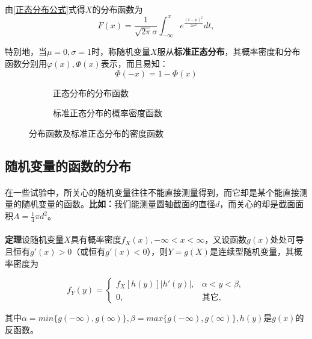 \paragraph{}
由\eqref{正态分布公式}式得$X$的分布函数为
\begin{equation}
  F(x) = \frac{1}{\sqrt{2\pi}\sigma}\int_{-\infty}^x e^{\frac{(t-\mu)^2}{2\sigma^2}}dt,
\end{equation}

特别地，当$\mu=0, \sigma=1$时，称随机变量$X$服从\textbf{标准正态分布}，其概率密度和分布函数分别用$\varphi(x), \Phi(x)$表示，而且易知：
\begin{equation}
  \Phi(-x) = 1 - \Phi(x)
\end{equation}

\begin{figure}[H]
\centering
  \begin{subfigure}[t]{0.48\linewidth}
    \centering
      
      \caption{正态分布的分布函数}
  \end{subfigure}
  \begin{subfigure}[t]{0.48\linewidth}
    \centering
      
      \caption{标准正态分布的概率密度函数}
  \end{subfigure}
  \caption{分布函数及标准正态分布的密度函数}
  \label{分布函数及标准正态分布的密度函数}
\end{figure}

\subsection{随机变量的函数的分布}
\paragraph{}
在一些试验中，所关心的随机变量往往不能直接测量得到，而它却是某个能直接测量的随机变量的函数。\textbf{比如：}我们能测量圆轴截面的直径$d$，而关心的却是截面面积$A=\frac{1}{4}\pi d^2$。

\paragraph{}
\textbf{定理\quad}设随机变量$X$具有概率密度$f_X(x), -\infty < x < \infty$，又设函数$g(x)$处处可导且恒有$g'(x)>0$（或恒有$g'(x)<0$），则$Y=g(X)$是连续型随机变量，其概率密度为

\begin{equation}
  f_Y(y) = \left\{ \begin{array}{ll}
    f_X[h(y)]|h'(y)|, & \alpha < y < \beta, \\ 0, & \text{其它,}
  \end{array}\right.
\end{equation}

其中$\alpha=min\{g(-\infty),g(\infty)\}, \beta=max\{g(-\infty),g(\infty)\}, h(y)$是$g(x)$的反函数。
